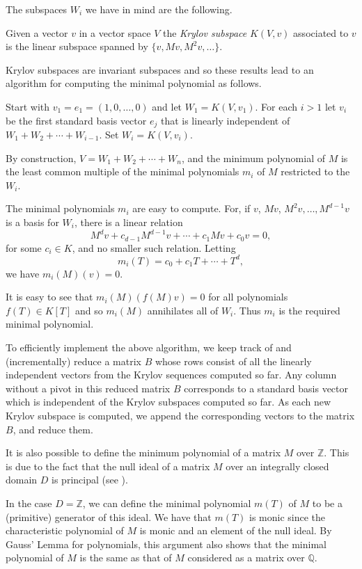 \documentclass{sig-alternate-05-2015}
\begin{document}
The subspaces $W_i$ we have in mind are the following.

\begin{definition}
Given a vector $v$ in a vector space $V$ the \emph{Krylov subspace} $K(V, v)$
associated to $v$ is the linear subspace spanned by $\{v, Mv, M^2v, \ldots\}$.
\end{definition}

Krylov subspaces are invariant subspaces and so these results lead to an
algorithm for computing the minimal polynomial as follows.

Start with $v_1 = e_1 = (1, 0, \ldots, 0)$ and let $W_1 = K(V, v_1)$.
For each $i > 1$ let $v_i$ be the first standard basis vector $e_j$ that is
linearly independent of $W_1 + W_2 + \cdots + W_{i-1}$. Set
$W_i = K(V, v_i)$. 

By construction, $V = W_1 + W_2 + \cdots + W_n$, and the minimum polynomial
of $M$ is the least common multiple of the minimal polynomials $m_i$ of
$M$ restricted to the $W_i$.

The minimal polynomials $m_i$ are easy to compute.
For, if $v$, $Mv$, $M^2v, \ldots, M^{d-1}v$ is a basis for $W_i$,
there is a linear relation 
$$M^dv + c_{d-1}M^{d-1}v + \cdots + c_1Mv + c_0v = 0,$$
for some $c_i \in K$, and no smaller such relation. Letting
$$m_i(T) = c_0 + c_1T + \cdots + T^d,$$ we have $m_i(M)(v) = 0$.

It is easy to see that $m_i(M)(f(M)v) = 0$ for all polynomials $f(T) \in K[T]$
and so $m_i(M)$ annihilates all of $W_i$. Thus $m_i$ is the required
minimal polynomial. 
 
To efficiently implement the above algorithm, we keep track of and
(incrementally) reduce a matrix $B$ whose rows consist of all the
linearly independent vectors from the Krylov sequences computed so far.
Any column without a pivot in this reduced matrix $B$ corresponds to a
standard basis vector which is independent of the Krylov subspaces computed
so far. As each new Krylov subspace is computed, we append the corresponding
vectors to the matrix $B$, and reduce them.

It is also possible to define the minimum polynomial of a matrix $M$ over
$\mathbb{Z}$. This is due to the fact that the null ideal of a matrix $M$ over
an integrally closed domain $D$ is principal (see \cite{brown}).

In the case $D = \mathbb{Z}$, we can define the minimal polynomial $m(T)$ of $M$
to be a (primitive) generator of this ideal. We have that $m(T)$ is monic since
the characteristic polynomial of $M$ is monic and an element of the null ideal.
By Gauss' Lemma for polynomials, this argument also shows that the minimal
polynomial of $M$ is the same as that of $M$ considered as a matrix over
$\mathbb{Q}$.
\end{document}
